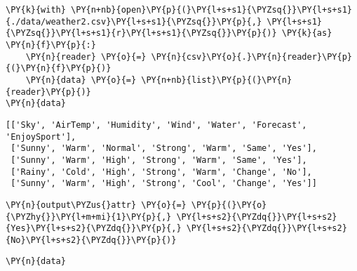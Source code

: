     \begin{tcolorbox}[breakable, size=fbox, boxrule=1pt, pad at break*=1mm,colback=cellbackground, colframe=cellborder]
\begin{Verbatim}[commandchars=\\\{\}]
\PY{k}{with} \PY{n+nb}{open}\PY{p}{(}\PY{l+s+s1}{\PYZsq{}}\PY{l+s+s1}{./data/weather2.csv}\PY{l+s+s1}{\PYZsq{}}\PY{p}{,} \PY{l+s+s1}{\PYZsq{}}\PY{l+s+s1}{r}\PY{l+s+s1}{\PYZsq{}}\PY{p}{)} \PY{k}{as} \PY{n}{f}\PY{p}{:}
    \PY{n}{reader} \PY{o}{=} \PY{n}{csv}\PY{o}{.}\PY{n}{reader}\PY{p}{(}\PY{n}{f}\PY{p}{)}
    \PY{n}{data} \PY{o}{=} \PY{n+nb}{list}\PY{p}{(}\PY{n}{reader}\PY{p}{)}
\PY{n}{data}
\end{Verbatim}
\end{tcolorbox}

            \begin{tcolorbox}[breakable, size=fbox, boxrule=.5pt, pad at break*=1mm, opacityfill=0]
\begin{Verbatim}[commandchars=\\\{\}]
[['Sky', 'AirTemp', 'Humidity', 'Wind', 'Water', 'Forecast', 'EnjoySport'],
 ['Sunny', 'Warm', 'Normal', 'Strong', 'Warm', 'Same', 'Yes'],
 ['Sunny', 'Warm', 'High', 'Strong', 'Warm', 'Same', 'Yes'],
 ['Rainy', 'Cold', 'High', 'Strong', 'Warm', 'Change', 'No'],
 ['Sunny', 'Warm', 'High', 'Strong', 'Cool', 'Change', 'Yes']]
\end{Verbatim}
\end{tcolorbox}
        
    \begin{tcolorbox}[breakable, size=fbox, boxrule=1pt, pad at break*=1mm,colback=cellbackground, colframe=cellborder]
\begin{Verbatim}[commandchars=\\\{\}]
\PY{n}{output\PYZus{}attr} \PY{o}{=} \PY{p}{(}\PY{o}{\PYZhy{}}\PY{l+m+mi}{1}\PY{p}{,} \PY{l+s+s2}{\PYZdq{}}\PY{l+s+s2}{Yes}\PY{l+s+s2}{\PYZdq{}}\PY{p}{,} \PY{l+s+s2}{\PYZdq{}}\PY{l+s+s2}{No}\PY{l+s+s2}{\PYZdq{}}\PY{p}{)}
\end{Verbatim}
\end{tcolorbox}

    \begin{tcolorbox}[breakable, size=fbox, boxrule=1pt, pad at break*=1mm,colback=cellbackground, colframe=cellborder]
\begin{Verbatim}[commandchars=\\\{\}]
\PY{n}{data}
\end{Verbatim}
\end{tcolorbox}

